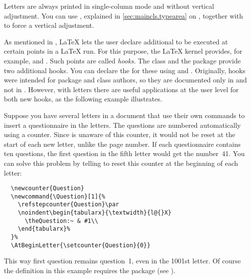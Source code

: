 Letters are always
printed in single-column mode and without vertical adjustment. You can use
, explained in \autoref{sec:maincls.typearea}
on , together with
 to force a vertical adjustment.%
\EndIndexGroup


\begin{Declaration}
\end{Declaration}
As mentioned in \cite{latex:clsguide}, \LaTeX{} lets the user declare
additional  to be executed at certain points in a \LaTeX{} run.
For this purpose, the \LaTeX{} kernel provides, for example,
 and
. Such points are called
\emph{hooks}. The  class and the
 package provide two additional hooks. You can declare the
 for these using  and
. Originally, hooks were
intended for package and class authors, so they are documented only in
\cite{latex:clsguide} and not in \cite{latex:usrguide}. However, with letters
there are useful applications at the user level for both new hooks, as the
following example illustrates.
%
\begin{Example}
  Suppose you have several letters in a document that use their own commands
  to insert a questionnaire in the letters. The questions are numbered
  automatically using a counter. Since \KOMAScript{} is unaware of this
  counter, it would not be reset at the start of each new letter, unlike the
  page number.  If each questionnaire contains ten questions, the first
  question in the fifth letter would get the number~41. You can solve this
  problem by telling \KOMAScript{} to reset this counter at the beginning of
  each letter:
\begin{lstlisting}
  \newcounter{Question}
  \newcommand{\Question}[1]{%
    \refstepcounter{Question}\par
    \noindent\begin{tabularx}{\textwidth}{l@{}X}
      \theQuestion:~ & #1\\
    \end{tabularx}%
  }%
  \AtBeginLetter{\setcounter{Question}{0}}
\end{lstlisting}
  This way first question remains question~1, even in the 1001st letter. Of
  course the definition in this example requires the
   package (see
  \cite{package:tabularx}).
\end{Example}%
%
\EndIndexGroup


